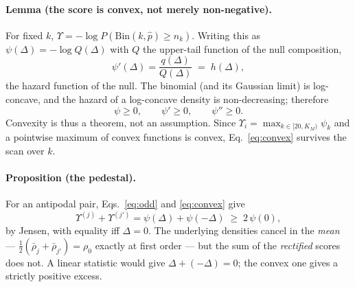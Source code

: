 \documentclass[11pt,a4paper]{article}
\newcommand{\Ups}{\Upsilon}                  %
\newcommand{\Ups}{\Upsilon}
\begin{document}
\paragraph{Lemma (the score is convex, not merely non-negative).}
For fixed $k$, $\Ups=-\log P\!\left(\mathrm{Bin}(k,\hat p)\ge n_k\right)$. Writing this
as $\psi(\Delta)=-\log Q(\Delta)$ with $Q$ the upper-tail function of the
null composition,
%
\begin{equation}
\psi'(\Delta)=\frac{q(\Delta)}{Q(\Delta)}\;=\;h(\Delta),
\end{equation}
%
the hazard function of the null. The binomial (and its Gaussian limit) is
log-concave, and the hazard of a log-concave density is non-decreasing; therefore
%
\begin{equation}
\psi\ge0,\qquad \psi'\ge0,\qquad \psi''\ge0 .
\label{eq:convex}
\end{equation}
%
Convexity is thus a theorem, not an assumption. Since $\Ups_i=\max_{k\in[20,K_M)}\psi_k$
and a pointwise maximum of convex functions is convex, Eq.~\eqref{eq:convex} survives
the scan over $k$.

\paragraph{Proposition (the pedestal).}
For an antipodal pair, Eqs.~\eqref{eq:odd} and \eqref{eq:convex} give
%
\begin{equation}
\Ups^{(j)}+\Ups^{(j')}=\psi(\Delta)+\psi(-\Delta)\;\ge\;2\,\psi(0),
\label{eq:jensen}
\end{equation}
%
by Jensen, with equality iff $\Delta=0$. The underlying densities cancel in the
\emph{mean} --- $\tfrac12(\bar\rho_j+\bar\rho_{j'})=\rho_0$ exactly at first order ---
but the sum of the \emph{rectified} scores does not. A linear statistic would give
$\Delta+(-\Delta)=0$; the convex one gives a strictly positive excess.
\end{document}
